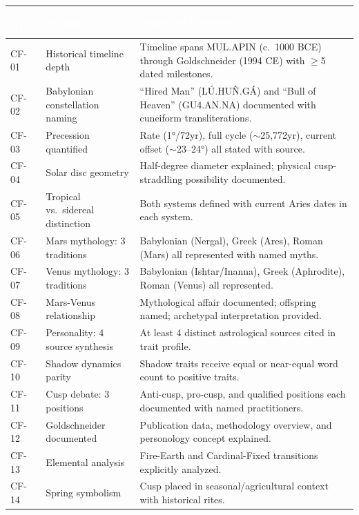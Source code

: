 \documentclass[11pt,letterpaper]{article}
\newcommand{\tableheader}[1]{\textbf{\sffamily\textcolor{white}{#1}}}
\begin{document}
\begin{center}
\begin{tabularx}{\textwidth}{C{1.2cm}L{3.5cm}X}
\toprule
{}
\tableheader{Test ID} & \tableheader{Verifies} & \tableheader{Expected Behavior} \\
\midrule
CF-01 & Historical timeline depth & Timeline spans MUL.APIN (c.\ 1000 BCE) through Goldschneider (1994 CE) with $\geq$5 dated milestones. \\
CF-02 & Babylonian constellation naming & ``Hired Man'' (LÚ.HUÑ.GÁ) and ``Bull of Heaven'' (GU4.AN.NA) documented with cuneiform transliterations. \\
CF-03 & Precession quantified & Rate (1°/72yr), full cycle ($\sim$25,772yr), current offset ($\sim$23--24°) all stated with source. \\
CF-04 & Solar disc geometry & Half-degree diameter explained; physical cusp-straddling possibility documented. \\
CF-05 & Tropical vs.\ sidereal distinction & Both systems defined with current Aries dates in each system. \\
CF-06 & Mars mythology: 3 traditions & Babylonian (Nergal), Greek (Ares), Roman (Mars) all represented with named myths. \\
CF-07 & Venus mythology: 3 traditions & Babylonian (Ishtar/Inanna), Greek (Aphrodite), Roman (Venus) all represented. \\
CF-08 & Mars-Venus relationship & Mythological affair documented; offspring named; archetypal interpretation provided. \\
CF-09 & Personality: 4 source synthesis & At least 4 distinct astrological sources cited in trait profile. \\
CF-10 & Shadow dynamics parity & Shadow traits receive equal or near-equal word count to positive traits. \\
CF-11 & Cusp debate: 3 positions & Anti-cusp, pro-cusp, and qualified positions each documented with named practitioners. \\
CF-12 & Goldschneider documented & Publication data, methodology overview, and personology concept explained. \\
CF-13 & Elemental analysis & Fire-Earth and Cardinal-Fixed transitions explicitly analyzed. \\
CF-14 & Spring symbolism & Cusp placed in seasonal/agricultural context with historical rites. \\
\bottomrule
\end{tabularx}
\end{center}
\end{document}
